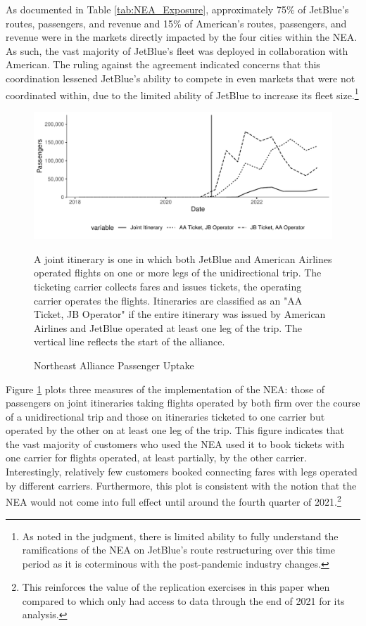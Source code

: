 \documentclass{article}
\begin{document}
	 As documented in Table \ref{tab:NEA_Exposure}, approximately 75\% of JetBlue's routes, passengers, and revenue and 15\% of American's routes, passengers, and revenue were in the markets directly impacted by the four cities within the NEA. As such, the vast majority of JetBlue's fleet was deployed in collaboration with American. The ruling against the agreement indicated concerns that this coordination lessened JetBlue's ability to compete in even markets that were not coordinated within, due to the limited ability of JetBlue to increase its fleet size.\footnote{As noted in the judgment, there is limited ability to fully understand the ramifications of the NEA on JetBlue's route restructuring over this time period as it is coterminous with the post-pandemic industry changes.}

    \begin{figure}
        \caption{Northeast Alliance Passenger Uptake}
        \label{fig:NEA_Uptake}
        \begin{center}
            \includegraphics[width = \linewidth]{05.Figures/NEA_OperationsGraph}
        \end{center}
        \vspace{-8mm}
        \footnotesize{A joint itinerary is one in which both JetBlue and American Airlines operated flights on one or more legs of the unidirectional trip. The ticketing carrier collects fares and issues tickets, the operating carrier operates the flights. Itineraries are classified as an "AA Ticket, JB Operator" if the entire itinerary was issued by American Airlines and JetBlue operated at least one leg of the trip. The vertical line reflects the start of the alliance. }
    \end{figure}

    Figure \ref{fig:NEA_Uptake} plots three measures of the implementation of the NEA: those of passengers on joint itineraries taking flights operated by both firm over the course of a unidirectional trip and those on itineraries ticketed to one carrier but operated by the other on at least one leg of the trip. This figure indicates that the vast majority of customers who used the NEA used it to book tickets with one carrier for flights operated, at least partially, by the other carrier. Interestingly, relatively few customers booked connecting fares with legs operated by different carriers. Furthermore, this plot is consistent with the notion that the NEA would not come into full effect until around the fourth quarter of 2021.\footnote{This reinforces the value of the replication exercises in this paper when compared to \citet{zou_assessing_2023} which only had access to data through the end of 2021 for its analysis.} 
    
\end{document}
